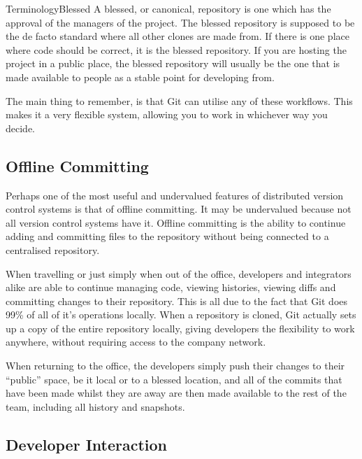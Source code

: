 \begin{callout}{Terminology}{Blessed}
A blessed, or canonical, repository is one which has the approval of the managers of the project.
The blessed repository is supposed to be the de facto standard where all other clones are made from.
If there is one place where code should be correct, it is the blessed repository.
If you are hosting the project in a public place, the blessed repository will usually be the one that is made available to people as a stable point for developing from.
\end{callout}

The main thing to remember, is that Git can utilise any of these workflows.
This makes it a very flexible system, allowing you to work in whichever way you decide.

\subsection{Offline Committing}

Perhaps one of the most useful and undervalued features of distributed version control systems is that of offline committing.
It may be undervalued because not all version control systems have it.
Offline committing is the ability to continue adding and committing files to the repository without being connected to a centralised repository.

When travelling or just simply when out of the office, developers and integrators alike are able to continue managing code, viewing histories, viewing diffs and committing changes to their repository.
This is all due to the fact that Git does 99\% of all of it's operations locally.
When a repository is cloned, Git actually sets up a copy of the entire repository locally, giving developers the flexibility to work anywhere, without requiring access to the company network.

When returning to the office, the developers simply push their changes to their ``public'' space, be it local or to a blessed location, and all of the commits that have been made whilst they are away are then made available to the rest of the team, including all history and snapshots.

\subsection{Developer Interaction}

